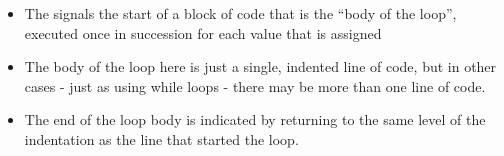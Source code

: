 \documentclass[letterpaper,10pt,english]{sphinxmanual}
\begin{document}
\begin{itemize}
\begin{itemize}
\begin{itemize}
\end{itemize}

\item {} 
The \sphinxcode{\sphinxupquote{:}} signals the start of a block of code that is the “body
of the loop”, executed once in succession for each value that
 is assigned

\item {} 
The body of the loop here is just a single, indented line of
code, but in other cases - just as using while loops - there may
be more than one line of code.

\item {} 
The end of the loop body is indicated by returning to the same
level of the indentation as the  line that started
the loop.

\end{itemize}

\end{itemize}
\end{document}
